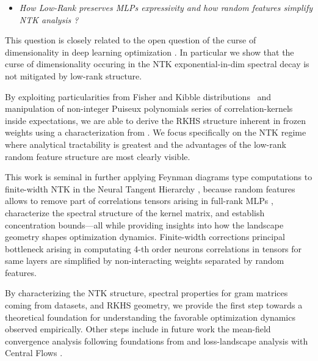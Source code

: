 \noindent
\begin{itemize}
\item \emph{How Low-Rank preserves MLPs expressivity and how random features simplify NTK analysis ?}
\end{itemize}
\vspace{0.5em}

This question is closely related to the open question of the curse of dimensionality in deep learning optimization \cite{na2025cursedimensionalityneuralnetwork}.
In particular we show that the curse of dimensionality occuring in the NTK exponential-in-dim spectral decay is not mitigated by low-rank structure.

By exploiting particularities from Fisher and Kibble distributions~\cite{fisher1915probable,hotelling1953new} and manipulation
of non-integer Puiseux polynomials series of correlation-kernels inside expectations, we are able to derive 
the RKHS structure inherent in frozen weights using a characterization from \cite{bietti2021deepequalsshallowrelu}. We focus specifically on the NTK regime where analytical tractability is greatest and the advantages of the 
low-rank random feature structure are most clearly visible.


This work is seminal in further applying Feynman diagrams type computations to finite-width  NTK in the Neural Tangent Hierarchy \cite{dyer2019asymptoticswidenetworksfeynman}, 
because random features allows to remove part of correlations tensors arising in full-rank MLPs 
 , characterize the spectral structure of the kernel matrix, and establish concentration 
 bounds—all while providing insights into how the landscape geometry shapes optimization dynamics.
 Finite-width corrections principal bottleneck arising
 in computating 4-th order neurons correlations in tensors for same layers \cite{guillen2025finitewidthneuraltangentkernels} are simplified
  by non-interacting weights separated by random features.

 
By characterizing the NTK structure, spectral properties for gram matrices coming from datasets, 
and RKHS geometry, we provide the first step towards a theoretical foundation for understanding the favorable optimization dynamics observed empirically. 
Other steps include in future work the mean-field convergence analysis following foundations from \cite{nguyen2023rigorousframeworkmeanfield} and loss-landscape analysis
 with Central Flows \cite{cohen2025understandingoptimizationdeeplearning}. 

 

